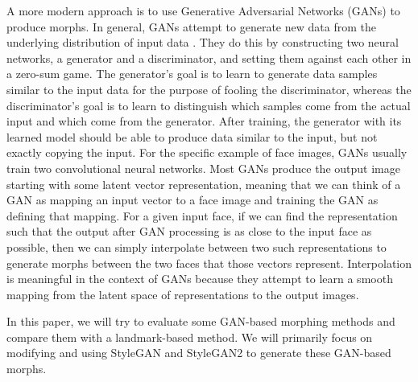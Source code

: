 \documentclass[12pt]{article}
\begin{document}
A more modern approach is to use Generative Adversarial Networks (GANs) to produce morphs. In general, GANs attempt to generate new data from the underlying distribution of input data \cite{goodfellow2014generative}. They do this by constructing two neural networks, a generator and a discriminator, and setting them against each other in a zero-sum game. The generator's goal is to learn to generate data samples similar to the input data for the purpose of fooling the discriminator, whereas the discriminator's goal is to learn to distinguish which samples come from the actual input and which come from the generator. After training, the generator with its learned model should be able to produce data similar to the input, but not exactly copying the input. For the specific example of face images, GANs usually train two convolutional neural networks. Most GANs produce the output image starting with some latent vector representation, meaning that we can think of a GAN as mapping an input vector to a face image and training the GAN as defining that mapping. For a given input face, if we can find the representation such that the output after GAN processing is as close to the input face as possible, then we can simply interpolate between two such representations to generate morphs between the two faces that those vectors represent. Interpolation is meaningful \cite{abdal2019iamge2stylegan} in the context of GANs because they attempt to learn a smooth mapping from the latent space of representations to the output images.
\par
In this paper, we will try to evaluate some GAN-based morphing methods and compare them with a landmark-based method. We will primarily focus on modifying and using StyleGAN and StyleGAN2 to generate these GAN-based morphs.
\end{document}
